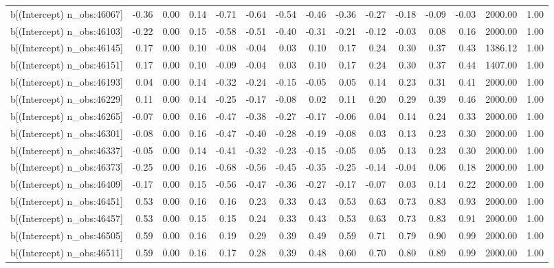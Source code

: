 \begin{table}[ht]
\begin{tabular}{rrrrrrrrrrrrrrr}
  b[(Intercept) n\_obs:46067] & -0.36 & 0.00 & 0.14 & -0.71 & -0.64 & -0.54 & -0.46 & -0.36 & -0.27 & -0.18 & -0.09 & -0.03 & 2000.00 & 1.00 \\ 
  b[(Intercept) n\_obs:46103] & -0.22 & 0.00 & 0.15 & -0.58 & -0.51 & -0.40 & -0.31 & -0.21 & -0.12 & -0.03 & 0.08 & 0.16 & 2000.00 & 1.00 \\ 
  b[(Intercept) n\_obs:46145] & 0.17 & 0.00 & 0.10 & -0.08 & -0.04 & 0.03 & 0.10 & 0.17 & 0.24 & 0.30 & 0.37 & 0.43 & 1386.12 & 1.00 \\ 
  b[(Intercept) n\_obs:46151] & 0.17 & 0.00 & 0.10 & -0.09 & -0.04 & 0.03 & 0.10 & 0.17 & 0.24 & 0.30 & 0.37 & 0.44 & 1407.00 & 1.00 \\ 
  b[(Intercept) n\_obs:46193] & 0.04 & 0.00 & 0.14 & -0.32 & -0.24 & -0.15 & -0.05 & 0.05 & 0.14 & 0.23 & 0.31 & 0.41 & 2000.00 & 1.00 \\ 
  b[(Intercept) n\_obs:46229] & 0.11 & 0.00 & 0.14 & -0.25 & -0.17 & -0.08 & 0.02 & 0.11 & 0.20 & 0.29 & 0.39 & 0.46 & 2000.00 & 1.00 \\ 
  b[(Intercept) n\_obs:46265] & -0.07 & 0.00 & 0.16 & -0.47 & -0.38 & -0.27 & -0.17 & -0.06 & 0.04 & 0.14 & 0.24 & 0.33 & 2000.00 & 1.00 \\ 
  b[(Intercept) n\_obs:46301] & -0.08 & 0.00 & 0.16 & -0.47 & -0.40 & -0.28 & -0.19 & -0.08 & 0.03 & 0.13 & 0.23 & 0.30 & 2000.00 & 1.00 \\ 
  b[(Intercept) n\_obs:46337] & -0.05 & 0.00 & 0.14 & -0.41 & -0.32 & -0.23 & -0.15 & -0.05 & 0.05 & 0.13 & 0.23 & 0.30 & 2000.00 & 1.00 \\ 
  b[(Intercept) n\_obs:46373] & -0.25 & 0.00 & 0.16 & -0.68 & -0.56 & -0.45 & -0.35 & -0.25 & -0.14 & -0.04 & 0.06 & 0.18 & 2000.00 & 1.00 \\ 
  b[(Intercept) n\_obs:46409] & -0.17 & 0.00 & 0.15 & -0.56 & -0.47 & -0.36 & -0.27 & -0.17 & -0.07 & 0.03 & 0.14 & 0.22 & 2000.00 & 1.00 \\ 
  b[(Intercept) n\_obs:46451] & 0.53 & 0.00 & 0.16 & 0.16 & 0.23 & 0.33 & 0.43 & 0.53 & 0.63 & 0.73 & 0.83 & 0.93 & 2000.00 & 1.00 \\ 
  b[(Intercept) n\_obs:46457] & 0.53 & 0.00 & 0.15 & 0.15 & 0.24 & 0.33 & 0.43 & 0.53 & 0.63 & 0.73 & 0.83 & 0.91 & 2000.00 & 1.00 \\ 
  b[(Intercept) n\_obs:46505] & 0.59 & 0.00 & 0.16 & 0.19 & 0.29 & 0.39 & 0.49 & 0.59 & 0.71 & 0.79 & 0.90 & 0.99 & 2000.00 & 1.00 \\ 
  b[(Intercept) n\_obs:46511] & 0.59 & 0.00 & 0.16 & 0.17 & 0.28 & 0.39 & 0.48 & 0.60 & 0.70 & 0.80 & 0.89 & 0.99 & 2000.00 & 1.00 \\ 

\end{tabular}
\end{table}
